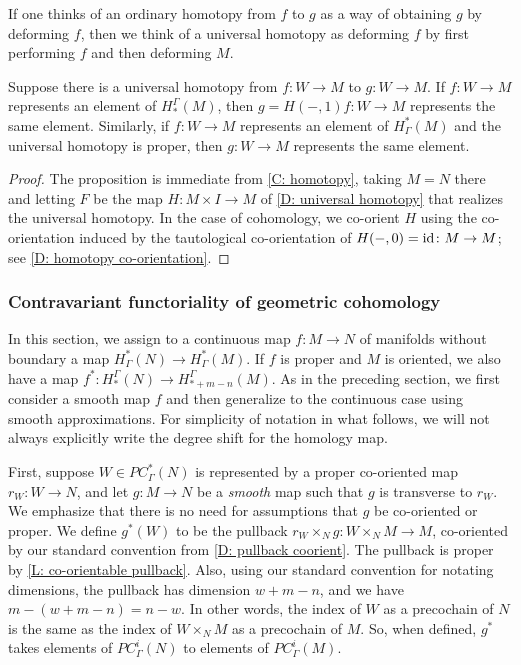 If one thinks of an ordinary homotopy from $f$ to $g$ as a way of obtaining $g$ by deforming $f$, then we think of a universal homotopy as deforming $f$ by first performing $f$ and then deforming $M$.


\begin{proposition}\label{P: universal homotopy}
	Suppose there is a universal homotopy from $f \colon W\to M$ to $g \colon W\to M$. If $f \colon W\to M$ represents an element of $H_*^\Gamma(M)$, then $g = H(-,1)f \colon W\to M$ represents the same element. Similarly, if $f \colon W\to M$ represents an element of $H^*_\Gamma(M)$ and the universal homotopy is proper, then $g \colon W\to M$ represents the same element.
\end{proposition}

\begin{proof}
	The proposition is immediate from \cref{C: homotopy}, taking $M=N$ there and letting $F$ be the map $H \colon M \times I \to M$ of \cref {D: universal homotopy} that realizes the universal homotopy. In the case of cohomology, we co-orient $H$ using the co-orientation induced by the tautological co-orientation of $H(-,0) = \mathrm{id} \colon M \to M$; see \cref{D: homotopy co-orientation}.
\end{proof}

\subsubsection{Contravariant functoriality of geometric cohomology}\label{S: cohomology pullback}

In this section, we assign to a continuous map $f \colon M \to N$ of manifolds without boundary a map $H^*_\Gamma(N) \to H^*_\Gamma(M)$.
If $f$ is proper and $M$ is oriented, we also have a map $f^* \colon H_*^\Gamma(N) \to H_{*+m-n}^\Gamma(M)$.
As in the preceding section, we first consider a smooth map $f$ and then generalize to the continuous case using smooth approximations.
For simplicity of notation in what follows, we will not always explicitly write the degree shift for the homology map.

First, suppose $W \in PC^*_\Gamma(N)$ is represented by a proper co-oriented map $r_W \colon W \to N$, and let $g \colon M \to N$ be a \textit{smooth} map such that $g$ is transverse to $r_W$.
We emphasize that there is no need for assumptions that $g$ be co-oriented or proper.
We define $g^*(W)$ to be the pullback $r_W \times_N g \colon W \times_N M \to M$, co-oriented by our standard convention from \cref{D: pullback coorient}.
The pullback is proper by \cref{L: co-orientable pullback}.
Also, using our standard convention for notating dimensions, the pullback has dimension $w+m-n$, and we have $m - (w+m-n) = n - w$. In other words, the index of $W$ as a precochain of $N$ is the same as the index of $W \times_N M$ as a precochain of $M$.
So, when defined, $g^*$ takes elements of $PC_\Gamma^i(N)$ to elements of $PC_\Gamma^i(M)$.


